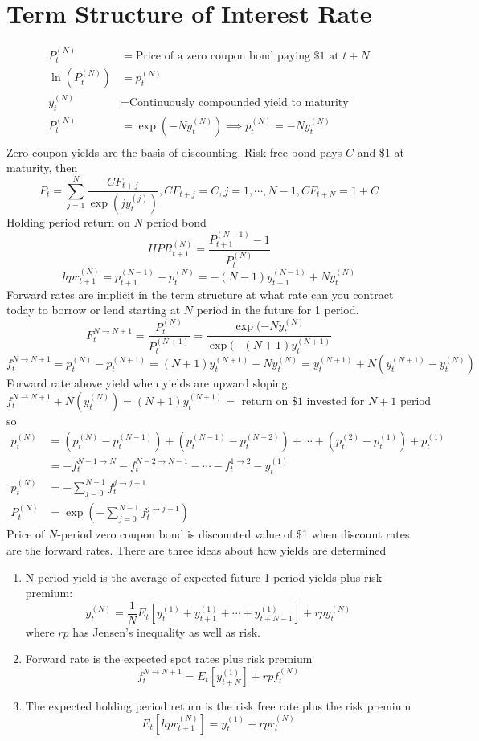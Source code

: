 \documentclass[11pt, a4paper, oneside]{article}
\theoremstyle{definition}
\theoremstyle{proposition}
\theoremstyle{corollary}
\theoremstyle{lemma}
\theoremstyle{theorem}
\begin{document}
\section{Term Structure of Interest Rate}
\begin{align*}
P^{(N)}_t &= \text{Price of a zero coupon bond paying \$1 at } t +N \\
\ln(P_t^{(N)}) &= p_t^{(N)} \\
y_t^{(N)} & =\text{Continuously compounded yield to maturity}  \\
P_t^{(N)} &= \exp(-Ny_t^{(N)}) \implies p_t^{(N)} = -Ny_t^{(N)} \\
\end{align*}
Zero coupon yields are the basis of discounting. Risk-free bond pays $C$ and \$1 at maturity, then
$$P_t = \sum_{j=1}^N \frac{C F_{t+j}}{\exp(j y^{(j)}_t)}, CF_{t+j} = C, j = 1, \cdots, N-1, CF_{t+N} = 1 + C$$
Holding period return on $N$ period bond
$$HPR_{t+1}^{(N)} = \frac{P_{t+1}^{(N-1)} - 1}{P_t^{(N)}}$$
$$hpr_{t+1}^{(N)} = p_{t+1}^{(N -1)} - p_t^{(N)} = -(N-1)y^{(N-1)}_{t+1} + Ny_t^{(N)}$$
Forward rates are implicit in the term structure at what rate can you contract today to borrow or lend starting at $N$ period in the future for 1 period. 
$$F_t^{N \to N +1} = \frac{P_t^{(N)}}{P^{(N+1)}_t} = \frac{\exp(- Ny_t^{(N)}}{\exp(-(N+1)y_t^{(N+1)}}$$
$$f_t^{N \to N+1} = p_t^{(N)} - p_t^{(N+1)} = (N+1)y_t^{(N+1)} - Ny_t^{(N)} = y_t^{(N+1)} + N(y_t^{(N+1)} - y_t^{(N)})$$
Forward rate above yield when yields are upward sloping. 
$$f_t^{N \to N+1} + N(y_t^{(N)}) = (N+1) y_t^{(N+1)} = \text{ return on \$1 invested for } N+1 \text{ period}$$
so 
\begin{align*} 
p_t^{(N)} &= (p_t^{(N)} - p_t^{(N-1)}) + (p_t^{(N-1)} - p_t^{(N-2)}) + \cdots + (p_t^{(2)} - p_t^{(1)}) + p_t^{(1)}\\
&=-f_t^{N-1 \to N} - f_t^{N-2 \to N-1} - \cdots -f_t^{1 \to 2} - y_t^{(1)}\\
p_t^{(N)} &= -\sum_{j=0}^{N-1} f_t^{j \to j+1}\\
P_t^{(N)} &= \exp\left(-\sum_{j=0}^{N-1} f_t^{j \to j+1}\right)
\end{align*}
Price of $N$-period zero coupon bond is discounted value of \$1 when discount rates are the forward rates. There are three ideas about how yields are determined
\begin{enumerate}
\item N-period yield is the average of expected future 1 period yields plus risk premium:
$$y_t^{(N)} = \frac{1}{N}E_t[y_{t}^{(1)}+y_{t+1}^{(1)} + \cdots + y_{t+N-1}^{(1)}] +rp y_t^{(N)}$$
where $rp$ has Jensen's inequality as well as risk. 
\item Forward rate is the expected spot rates plus risk premium 
$$f_t^{N \to N+1} = E_t[y_{t+N}^{(1)}] + rp f_t^{(N)}$$
\item The expected holding period return is the risk free rate plus the risk premium
$$E_t[hpr_{t+1}^{(N)}] = y_t^{(1)} + rp r_t^{(N)}$$
\end{enumerate}
\end{document}
